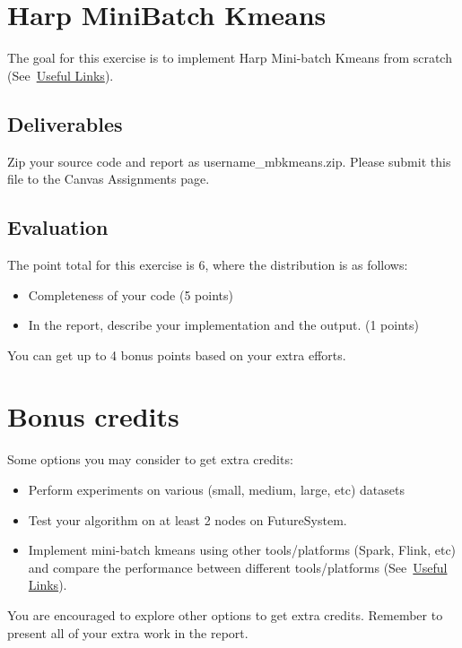\section*{Harp Mini\-Batch Kmeans}


The goal for this exercise is to implement Harp Mini-batch Kmeans
from scratch (See~\hyperlink{link_exercise8}{Useful Links}). 

\subsection*{Deliverables}
Zip your source code and report as username\_mbkmeans.zip. Please submit this
file to the Canvas Assignments page.

\subsection*{Evaluation}

The point total for this exercise is 6, where the distribution is as
follows:

\begin{itemize}
\item Completeness of your code (5 points)
\item In the report, describe your implementation and the output. (1 points)
\end{itemize}

You can get up to 4 bonus points based on your extra efforts.

\section*{Bonus credits}

Some options you may consider to get extra credits: 

\begin{itemize}
\item Perform experiments on various (small, medium, large, etc)
  datasets
\item Test your algorithm on at least 2 nodes on FutureSystem.
\item Implement mini-batch kmeans using other tools/platforms (Spark,
  Flink, etc) and compare the performance between different
  tools/platforms (See~\hyperlink{link_exercise8}{Useful Links}).
\end{itemize}

You are encouraged to explore other options to get extra
credits. Remember to present all of your extra work in the report.
 
